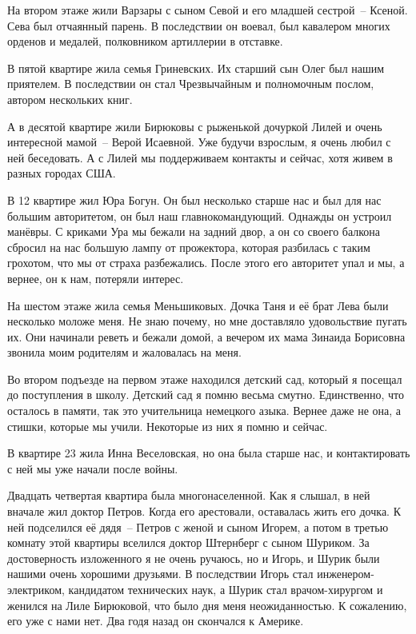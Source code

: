 На втором этаже жили Варзары с сыном Севой и его младшей сестрой~-- Ксеной. Сева был отчаянный парень.
В последствии он воевал, был кавалером многих орденов и медалей, полковником артиллерии в отставке.

В пятой квартире жила семья Гриневских. Их старший сын Олег был нашим приятелем. В последствии он стал Чрезвычайным и полномочным послом, автором нескольких книг.

А в десятой квартире жили Бирюковы с рыженькой дочуркой Лилей и очень интересной мамой~-- Верой Исаевной. Уже будучи взрослым, я очень любил с ней беседовать. А с Лилей мы поддерживаем контакты и сейчас, хотя живем в разных городах США.

В 12 квартире жил Юра Богун. Он был несколько старше нас и был для нас большим авторитетом, он был наш главнокомандующий. Однажды он устроил манёвры. С криками Ура мы бежали на задний двор, а он со своего балкона сбросил на нас большую лампу от прожектора, которая разбилась с таким грохотом, что мы от страха разбежались. После этого его авторитет упал и мы, а вернее, он к нам, потеряли интерес.

На шестом этаже жила семья Меньшиковых. Дочка Таня и её брат Лева были несколько моложе меня. Не знаю почему, но мне доставляло удовольствие пугать их. Они начинали реветь и бежали домой, а вечером их мама Зинаида Борисовна звонила моим родителям и жаловалась на меня.

Во втором подъезде на первом этаже находился детский сад, который я посещал до поступления в школу.
Детский сад я помню весьма смутно. Единственно, что осталось в памяти, так это учительница немецкого азыка. Вернее даже не  она, а стишки, которые мы учили. Некоторые из них я помню и сейчас.

В квартире 23 жила Инна Веселовская, но она была старше нас, и  контактировать с ней мы уже начали после войны.

Двадцать четвертая квартира была многонаселенной. Как я слышал, в ней вначале жил доктор Петров. Когда его арестовали, оставалась жить его дочка. К ней подселился её дядя~-- Петров с женой и сыном Игорем, а потом в третью комнату этой квартиры вселился доктор Штернберг с сыном Шуриком. За достоверность изложенного я не очень ручаюсь, но и Игорь, и Шурик были нашими очень хорошими друзьями. В последствии Игорь стал инженером-электриком, кандидатом технических наук, а Шурик стал врачом-хирургом и женился на Лиле Бирюковой, что было дня меня неожиданностью. К сожалению, его уже с нами нет. Два годя назад он скончался к Америке.

